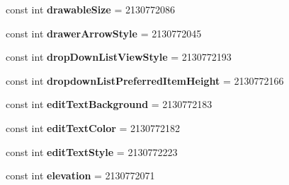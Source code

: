 \begin{DoxyCompactItemize}
\item 
\hypertarget{classClient_1_1Droid_1_1Resource_1_1Attribute_a62f6dbeb2a6515a81479b7785679d702}{}const int {\bfseries drawable\+Size} = 2130772086\label{classClient_1_1Droid_1_1Resource_1_1Attribute_a62f6dbeb2a6515a81479b7785679d702}

\item 
\hypertarget{classClient_1_1Droid_1_1Resource_1_1Attribute_a7083a1b126862f525ec898b789b010eb}{}const int {\bfseries drawer\+Arrow\+Style} = 2130772045\label{classClient_1_1Droid_1_1Resource_1_1Attribute_a7083a1b126862f525ec898b789b010eb}

\item 
\hypertarget{classClient_1_1Droid_1_1Resource_1_1Attribute_a00efc7cd673eec836005c1145582575d}{}const int {\bfseries drop\+Down\+List\+View\+Style} = 2130772193\label{classClient_1_1Droid_1_1Resource_1_1Attribute_a00efc7cd673eec836005c1145582575d}

\item 
\hypertarget{classClient_1_1Droid_1_1Resource_1_1Attribute_a608511e99028ea2a39362f55356bab4e}{}const int {\bfseries dropdown\+List\+Preferred\+Item\+Height} = 2130772166\label{classClient_1_1Droid_1_1Resource_1_1Attribute_a608511e99028ea2a39362f55356bab4e}

\item 
\hypertarget{classClient_1_1Droid_1_1Resource_1_1Attribute_aa48c92039c646dd95032c9a224d10a5f}{}const int {\bfseries edit\+Text\+Background} = 2130772183\label{classClient_1_1Droid_1_1Resource_1_1Attribute_aa48c92039c646dd95032c9a224d10a5f}

\item 
\hypertarget{classClient_1_1Droid_1_1Resource_1_1Attribute_aab761645b43367160a3badc104ac12fe}{}const int {\bfseries edit\+Text\+Color} = 2130772182\label{classClient_1_1Droid_1_1Resource_1_1Attribute_aab761645b43367160a3badc104ac12fe}

\item 
\hypertarget{classClient_1_1Droid_1_1Resource_1_1Attribute_a29235ef6ce792e8e18de44d81a75bb81}{}const int {\bfseries edit\+Text\+Style} = 2130772223\label{classClient_1_1Droid_1_1Resource_1_1Attribute_a29235ef6ce792e8e18de44d81a75bb81}

\item 
\hypertarget{classClient_1_1Droid_1_1Resource_1_1Attribute_af9067b321325019bcde93eaa5583532b}{}const int {\bfseries elevation} = 2130772071\label{classClient_1_1Droid_1_1Resource_1_1Attribute_af9067b321325019bcde93eaa5583532b}


\end{DoxyCompactItemize}
